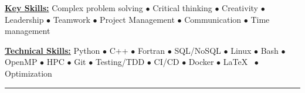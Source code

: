 \vspace*{-5mm}
\begin{multicols}{2}
    \begin{spacing}{1}
        \href{.}{\bf Key Skills:}
        Complex problem solving $\bullet$ Critical thinking $\bullet$ Creativity $\bullet$ Leadership $\bullet$ Teamwork $\bullet$ Project Management $\bullet$ Communication $\bullet$ Time management

        \href{.}{\bf Technical Skills:}
        Python $\bullet$ C++ $\bullet$ Fortran $\bullet$ SQL/NoSQL $\bullet$ Linux $\bullet$ Bash $\bullet$ OpenMP $\bullet$ HPC $\bullet$ Git $\bullet$ Testing/TDD $\bullet$ CI/CD $\bullet$ Docker $\bullet$ \LaTeX~ $\bullet$ Optimization
    \end{spacing}
\end{multicols}

\vspace*{-10mm}
\begin{center}
    \par\rule{1.0\textwidth}{0.6pt}
\end{center}
\vspace*{-8mm}